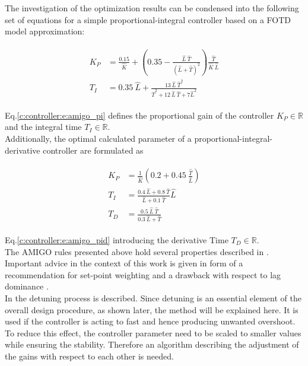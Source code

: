 The investigation of the optimization results can be condensed into the following set of equations for a simple proportional-integral controller based on a FOTD model approximation:

\begin{align}
\begin{split}
K_P &= \frac{0.15}{\hat{K}}+ \left(0.35 - \frac{\hat{L}~\hat{T}}{\left( \hat{L}+\hat{T} \right)^2} \right) \frac{\hat{T}}{\hat{K}~\hat{L}} \\
T_I &= 0.35~ \hat{L} + \frac{13~\hat{L}~\hat{T}^2}{\hat{T}^2 + 12~\hat{L}~\hat{T}+7 \hat{L}^2}
\end{split}
\label{c:controller:e:amigo_pi}
\end{align}

Eq.\ref{c:controller:e:amigo_pi} defines the proportional gain of the controller $K_P \in \mathbb{R}$ and the integral time $T_I \in \mathbb{R}$.\\

Additionally, the optimal calculated parameter of a proportional-integral-derivative controller are formulated as

\begin{align}
\begin{split}
K_P &= \frac{1}{\hat{K}} \left( 0.2 + 0.45~ \frac{\hat{T}}{\hat{L}}\right)\\
T_I &= \frac{0.4~\hat{L}+0.8~\hat{T}}{\hat{L}+0.1~\hat{T}}\hat{L}\\
T_D &= \frac{0.5~\hat{L}~\hat{T}}{0.3~\hat{L}+\hat{T}}
\end{split}
\label{c:controller:e:amigo_pid}
\end{align}

Eq.\ref{c:controller:e:amigo_pid} introducing the derivative Time $T_D \in \mathbb{R}$.\\

The AMIGO rules presented above hold several properties described in \cite[p.229 ff.]{Astrom2006}. Important advice in the context of this work is given in form of a recommendation for set-point weighting \cite[p.229 f., p.235 ff.]{Astrom2006} and a drawback with respect to lag dominance \cite[p.231 ff.]{Astrom2006}.\\ 

In \cite[p.253 ff.]{Astrom2006} the detuning process is described. Since detuning is an essential element of the overall design procedure, as shown later, the method will be explained here. It is used if the controller is acting to fast and hence producing unwanted overshoot. To reduce this effect, the controller parameter need to be scaled to smaller values while ensuring the stability. Therefore an algorithm describing the adjustment of the gains with respect to each other is needed.\\

